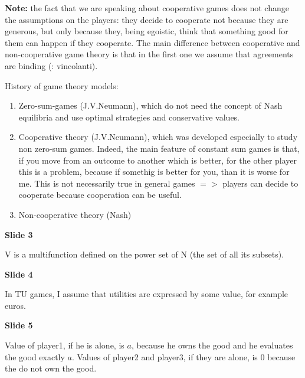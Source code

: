 
%



\bigskip
\noindent \textbf{Note:} the fact that we are speaking about cooperative 
games does not change the assumptions on the players: they decide to 
cooperate not because they are generous, but only because they, being 
egoistic, think that something good for them can happen if they cooperate. 
The main difference between cooperative and non-cooperative game theory is that 
in the first one we assume that agreements are binding (: vincolanti).

\noindent History of game theory models:
\begin{enumerate}
	\item Zero-sum-games (J.V.Neumann), which do not need the concept of 
		Nash equilibria and use optimal strategies and conservative 
		values.
	\item Cooperative theory (J.V.Neumann), which was developed especially 
		to study non zero-sum games. Indeed, the main feature of 
		constant sum games is that, if you move from an outcome to 
		another which is better, for the other player this is a 
		problem, because if somethig is better for you, than it is 
		worse for me. This is not necessarily true in general games 
		$=>$ players can decide to cooperate because cooperation can 
		be useful.
	\item Non-cooperative theory (Nash)
\end{enumerate}

\bigskip
\noindent \textbf{Slide 3}

\noindent V is a multifunction defined on the power set of N (the set of all 
its subsets).

\bigskip
\noindent \textbf{Slide 4}

\noindent In TU games, I assume that utilities are expressed by some value, 
for example euros.

\bigskip
\noindent \textbf{Slide 5}

\noindent Value of player1, if he is alone, is $a$, because he owns the 
good and he evaluates the good exactly $a$. Values of player2 and player3, 
if they are alone, is 0 because the do not own the good.

